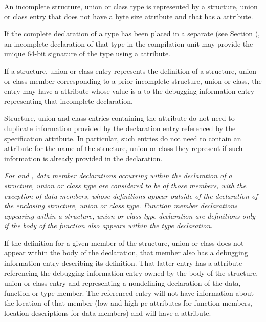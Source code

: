 An incomplete structure, union or class type 
is 
represented by a structure, union or class
entry that does not have a byte size attribute and that has
a \DWATdeclaration{} attribute.

If the complete declaration of a type has been placed in
\hypertarget{chap:DWATsignaturetypesignature}{}
a separate 
(see Section ), 
an incomplete declaration 
of that type in the compilation unit may provide
the unique 64-bit signature of the type using 
a \DWATsignature{}
attribute.

If a structure, union or class entry represents the definition
of a structure, union or class member corresponding to a prior
incomplete structure, union or class, the entry may have a
\DWATspecification{} attribute 
whose value is a  to
the debugging information entry representing that incomplete
declaration.

Structure, union and class entries containing the
\DWATspecification{} attribute 
do not need to duplicate
information provided by the declaration entry referenced by the
specification attribute.  In particular, such entries do not
need to contain an attribute for the name of the structure,
union or class they represent if such information is already
provided in the declaration.

\textit{For  and , 
data 
member declarations occurring within
the declaration of a structure, union or class type are
considered to be  of those members, with
the exception of  data members, whose definitions
appear outside of the declaration of the enclosing structure,
union or class type. Function member declarations appearing
within a structure, union or class type declaration are
definitions only if the body of the function also appears
within the type declaration.}

If the definition for a given member of the structure, union
or class does not appear within the body of the declaration,
that member also has a debugging information entry describing
its definition. That latter entry has a 
\DWATspecification{} attribute 
referencing the debugging information entry
owned by the body of the structure, union or class entry and
representing a non\dash defining declaration of the data, function
or type member. The referenced entry will not have information
about the location of that member (low and high pc attributes
for function members, location descriptions for data members)
and will have a \DWATdeclaration{} attribute.

